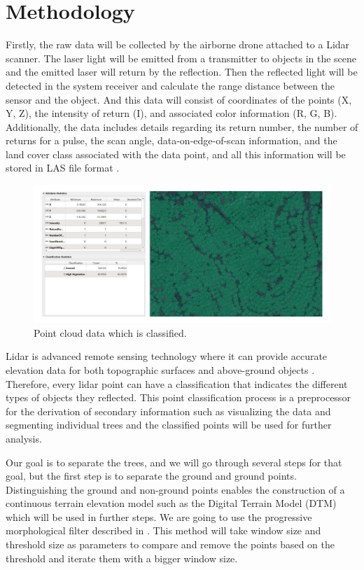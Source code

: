 \documentclass[a4paper, 12pt]{article}
\begin{document}
\section{Methodology}

Firstly, the raw data will be collected by the airborne drone attached to a Lidar scanner. The laser light will be emitted from a transmitter to objects in the scene and the emitted laser will return by the reflection. Then the reflected light will be detected in the system receiver and calculate the range distance between the sensor and the object. And this data will consist of coordinates of the points (X, Y, Z), the intensity of return (I), and associated color information (R, G, B). Additionally, the data includes details regarding its return number, the number of returns for a pulse, the scan angle, data-on-edge-of-scan information, and the land cover class associated with the data point, and all this information will be stored in LAS file format \cite{5}.

\begin{figure}[H]
    \centering
    \includegraphics[scale=0.2]{Images/classify.png}
    \caption{Point cloud data which is classified. }
\end{figure}

Lidar is advanced remote sensing technology where it can provide accurate elevation data for both topographic surfaces and above-ground objects \cite{1}. Therefore, every lidar point can have a classification that indicates the different types of objects they reflected. This point classification process is a preprocessor for the derivation of secondary information such as visualizing the data and segmenting individual trees and the classified points will be used for further analysis. 

Our goal is to separate the trees, and we will go through several steps for that goal, but the first step is to separate the ground and ground points. Distinguishing the ground and non-ground points enables the construction of a continuous terrain elevation model such as the Digital Terrain Model (DTM) which will be used in further steps. We are going to use the progressive morphological filter described in \cite{6}. This method will take window size and threshold size as parameters to compare and remove the points based on the threshold and iterate them with a bigger window size. 
\end{document}
